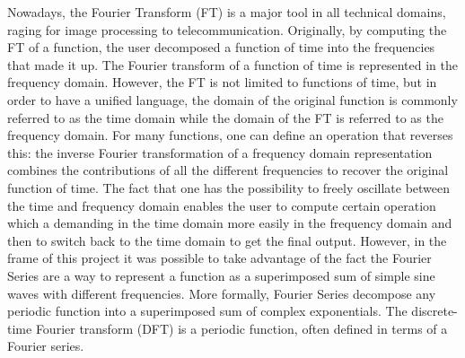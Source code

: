 Nowadays, the Fourier Transform (FT) is a major tool in all technical domains, raging for image processing to telecommunication. Originally, by computing the FT of a function, the user decomposed a function of time into the frequencies that made it up. The Fourier transform of a function of time is represented in the frequency domain. However, the FT is not limited to functions of time, but in order to have a unified language, the domain of the original function is commonly referred to as the time domain while the domain of the FT is referred to as the frequency domain. For many functions, one can define an operation that reverses this\+: the inverse Fourier transformation of a frequency domain representation combines the contributions of all the different frequencies to recover the original function of time. The fact that one has the possibility to freely oscillate between the time and frequency domain enables the user to compute certain operation which a demanding in the time domain more easily in the frequency domain and then to switch back to the time domain to get the final output. However, in the frame of this project it was possible to take advantage of the fact the Fourier Series are a way to represent a function as a superimposed sum of simple sine waves with different frequencies. More formally, Fourier Series decompose any periodic function into a superimposed sum of complex exponentials. The discrete-\/ time Fourier transform (D\+FT) is a periodic function, often defined in terms of a Fourier series. 